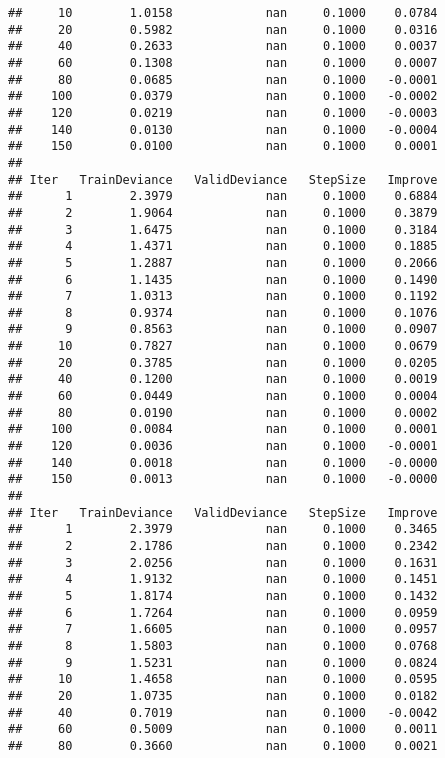 \documentclass[]{article}
\begin{document}
\begin{verbatim}
##     10        1.0158             nan     0.1000    0.0784
##     20        0.5982             nan     0.1000    0.0316
##     40        0.2633             nan     0.1000    0.0037
##     60        0.1308             nan     0.1000    0.0007
##     80        0.0685             nan     0.1000   -0.0001
##    100        0.0379             nan     0.1000   -0.0002
##    120        0.0219             nan     0.1000   -0.0003
##    140        0.0130             nan     0.1000   -0.0004
##    150        0.0100             nan     0.1000    0.0001
## 
## Iter   TrainDeviance   ValidDeviance   StepSize   Improve
##      1        2.3979             nan     0.1000    0.6884
##      2        1.9064             nan     0.1000    0.3879
##      3        1.6475             nan     0.1000    0.3184
##      4        1.4371             nan     0.1000    0.1885
##      5        1.2887             nan     0.1000    0.2066
##      6        1.1435             nan     0.1000    0.1490
##      7        1.0313             nan     0.1000    0.1192
##      8        0.9374             nan     0.1000    0.1076
##      9        0.8563             nan     0.1000    0.0907
##     10        0.7827             nan     0.1000    0.0679
##     20        0.3785             nan     0.1000    0.0205
##     40        0.1200             nan     0.1000    0.0019
##     60        0.0449             nan     0.1000    0.0004
##     80        0.0190             nan     0.1000    0.0002
##    100        0.0084             nan     0.1000    0.0001
##    120        0.0036             nan     0.1000   -0.0001
##    140        0.0018             nan     0.1000   -0.0000
##    150        0.0013             nan     0.1000   -0.0000
## 
## Iter   TrainDeviance   ValidDeviance   StepSize   Improve
##      1        2.3979             nan     0.1000    0.3465
##      2        2.1786             nan     0.1000    0.2342
##      3        2.0256             nan     0.1000    0.1631
##      4        1.9132             nan     0.1000    0.1451
##      5        1.8174             nan     0.1000    0.1432
##      6        1.7264             nan     0.1000    0.0959
##      7        1.6605             nan     0.1000    0.0957
##      8        1.5803             nan     0.1000    0.0768
##      9        1.5231             nan     0.1000    0.0824
##     10        1.4658             nan     0.1000    0.0595
##     20        1.0735             nan     0.1000    0.0182
##     40        0.7019             nan     0.1000   -0.0042
##     60        0.5009             nan     0.1000    0.0011
##     80        0.3660             nan     0.1000    0.0021

\end{verbatim}
\end{document}
